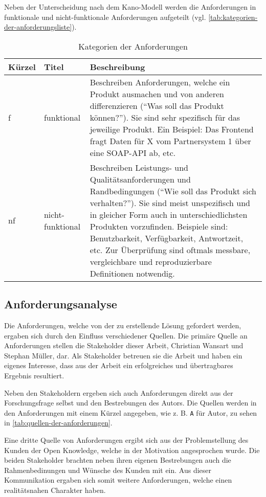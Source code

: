 Neben der Unterscheidung nach dem Kano-Modell werden die Anforderungen in funktionale und nicht-funktionale Anforderungen \cite{FunktionaleUndNichtFunktionaleAnforderungen} aufgeteilt (vgl. \autoref{tab:kategorien-der-anforderungsliste}).

\begin{table}[H]
\begin{tabular}{ |p{1.15cm}|p{2.75cm}|p{9.6cm}| }
	\hline
	Kürzel & Titel & Beschreibung \\
	\hline
	f & funktional & Beschreiben Anforderungen, welche ein Produkt ausmachen und von anderen differenzieren (\enquote{Was soll das Produkt können?}). Sie sind sehr spezifisch für das jeweilige Produkt. Ein Beispiel: Das Frontend fragt Daten für X vom Partnersystem 1 über eine SOAP-API ab, etc.\\
	\hline
	nf & nicht-funktional & Beschreiben Leistungs- und Qualitätsanforderungen und Randbedingungen (\enquote{Wie soll das Produkt sich verhalten?}). Sie sind meist unspezifisch und in gleicher Form auch in unterschiedlichsten Produkten vorzufinden. Beispiele sind: Benutzbarkeit, Verfügbarkeit, Antwortzeit, etc. Zur Überprüfung sind oftmals messbare, vergleichbare und reproduzierbare Definitionen notwendig. \\
	\hline
\end{tabular}
 \captionsetup{justification=centering}
  \caption{Kategorien der Anforderungen}
   \label{tab:kategorien-der-anforderungsliste}
\end{table}
	
\subsection{Anforderungsanalyse}

Die Anforderungen, welche von der zu erstellende Lösung gefordert werden, ergaben sich durch den Einfluss verschiedener Quellen. Die primäre Quelle an Anforderungen stellen die Stakeholder dieser Arbeit, Christian Wansart und Stephan Müller, dar. Als Stakeholder betreuen sie die Arbeit und haben ein eigenes Interesse, dass aus der Arbeit ein erfolgreiches und übertragbares Ergebnis resultiert.

Neben den Stakeholdern ergeben sich auch Anforderungen direkt aus der Forschungsfrage selbst und den Bestrebungen des Autors. Die Quellen werden in den Anforderungen mit einem Kürzel angegeben, wie z. B. \texttt{A} für Autor, zu sehen in \autoref{tab:quellen-der-anforderungen}.

Eine dritte Quelle von Anforderungen ergibt sich aus der Problemstellung des Kunden der Open Knowledge, welche in der Motivation angesprochen wurde. Die beiden Stakeholder brachten neben ihren eigenen Bestrebungen auch die Rahmenbedinungen und Wünsche des Kunden mit ein. Aus dieser Kommunikation ergaben sich somit weitere Anforderungen, welche einen realitätsnahen Charakter haben.

